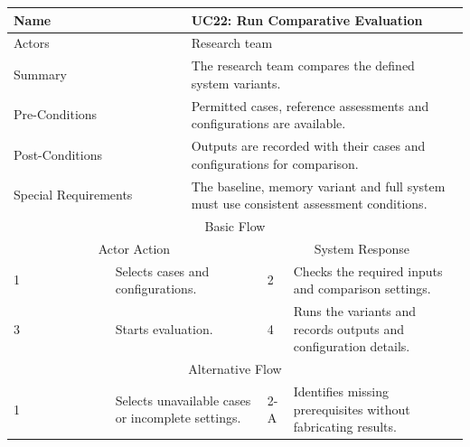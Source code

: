 \begin{reporttable}
\centering
\small
\caption{UC22: Run Comparative Evaluation.}
\label{tab:kashaf:uc22}
\begin{tabular}{|p{}|p{}|p{}|p{}|p{}|}
\hline
\multicolumn{2}{|p{\dimexpr0.225\textwidth+2\tabcolsep+\arrayrulewidth\relax}|}{Name} & \multicolumn{3}{p{\dimexpr0.575\textwidth+4\tabcolsep+2\arrayrulewidth\relax}|}{UC22: Run Comparative Evaluation} \\ \hline
\multicolumn{2}{|p{\dimexpr0.225\textwidth+2\tabcolsep+\arrayrulewidth\relax}|}{Actors} & \multicolumn{3}{p{\dimexpr0.575\textwidth+4\tabcolsep+2\arrayrulewidth\relax}|}{Research team} \\ \hline
\multicolumn{2}{|p{\dimexpr0.225\textwidth+2\tabcolsep+\arrayrulewidth\relax}|}{Summary} & \multicolumn{3}{p{\dimexpr0.575\textwidth+4\tabcolsep+2\arrayrulewidth\relax}|}{The research team compares the defined system variants.} \\ \hline
\multicolumn{2}{|p{\dimexpr0.225\textwidth+2\tabcolsep+\arrayrulewidth\relax}|}{Pre-Conditions} & \multicolumn{3}{p{\dimexpr0.575\textwidth+4\tabcolsep+2\arrayrulewidth\relax}|}{Permitted cases, reference assessments and configurations are available.} \\ \hline
\multicolumn{2}{|p{\dimexpr0.225\textwidth+2\tabcolsep+\arrayrulewidth\relax}|}{Post-Conditions} & \multicolumn{3}{p{\dimexpr0.575\textwidth+4\tabcolsep+2\arrayrulewidth\relax}|}{Outputs are recorded with their cases and configurations for comparison.} \\ \hline
\multicolumn{2}{|p{\dimexpr0.225\textwidth+2\tabcolsep+\arrayrulewidth\relax}|}{Special Requirements} & \multicolumn{3}{p{\dimexpr0.575\textwidth+4\tabcolsep+2\arrayrulewidth\relax}|}{The baseline, memory variant and full system must use consistent assessment conditions.} \\ \hline
\multicolumn{5}{|c|}{Basic Flow} \\ \hline
\multicolumn{3}{|c|}{Actor Action} & \multicolumn{2}{c|}{System Response} \\ \hline
1 & \multicolumn{2}{p{\dimexpr0.37\textwidth+2\tabcolsep+\arrayrulewidth\relax}|}{Selects cases and configurations.} & 2 & Checks the required inputs and comparison settings. \\ \hline
3 & \multicolumn{2}{p{\dimexpr0.37\textwidth+2\tabcolsep+\arrayrulewidth\relax}|}{Starts evaluation.} & 4 & Runs the variants and records outputs and configuration details. \\ \hline
\multicolumn{5}{|c|}{Alternative Flow} \\ \hline
1 & \multicolumn{2}{p{\dimexpr0.37\textwidth+2\tabcolsep+\arrayrulewidth\relax}|}{Selects unavailable cases or incomplete settings.} & 2-A & Identifies missing prerequisites without fabricating results. \\ \hline
\end{tabular}
\end{reporttable}


